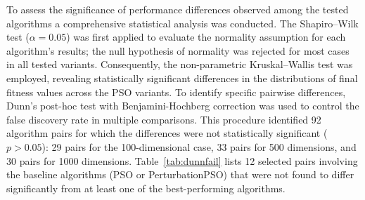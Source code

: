 {To assess the significance of performance differences observed among the tested algorithms a comprehensive statistical analysis was conducted. The Shapiro–Wilk test ($\alpha = 0.05$) was first applied to evaluate the normality assumption for each algorithm's results; the null hypothesis of normality was rejected for most cases in all tested variants. Consequently, the non-parametric Kruskal–Wallis test was employed, revealing statistically significant differences in the distributions of final fitness values across the PSO variants. To identify specific pairwise differences, Dunn’s post-hoc test with Benjamini-Hochberg correction \citep{haynes2013benjaminihochberg} was used to control the false discovery rate in multiple comparisons. This procedure identified 92 algorithm pairs for which the differences were not statistically significant ($p > 0.05$): 29 pairs for the 100-dimensional case, 33 pairs for 500 dimensions, and 30 pairs for 1000 dimensions.
%
Table~\ref{tab:dunnfail} lists 12 selected pairs involving the baseline algorithms (PSO or PerturbationPSO) that were not found to differ significantly from at least one of the best-performing algorithms.


}

